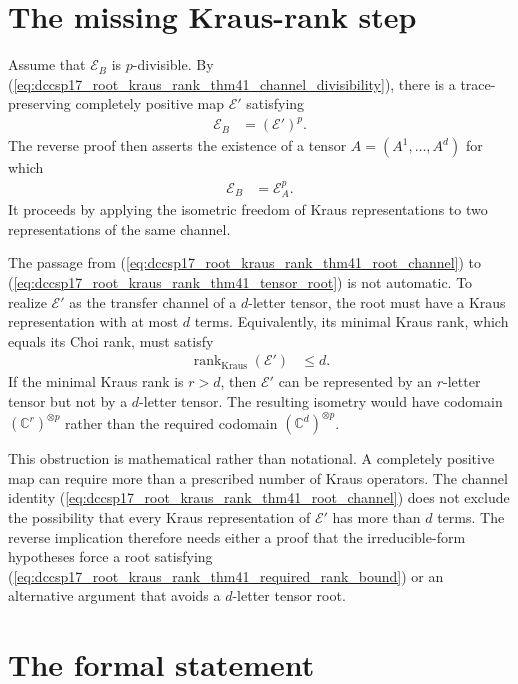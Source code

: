 \documentclass{article}
\begin{document}
\section{The missing Kraus-rank step}

Assume that $\mathcal E_B$ is $p$-divisible. By
(\ref{eq:dccsp17_root_kraus_rank_thm41_channel_divisibility}), there is a
trace-preserving completely positive map $\mathcal E'$ satisfying
\begin{align}
    \mathcal E_B
    &=(\mathcal E')^p.
    \label{eq:dccsp17_root_kraus_rank_thm41_root_channel}
\end{align}
The reverse proof then asserts the existence of a tensor
$A=(A^1,\ldots,A^d)$ for which
\begin{align}
    \mathcal E_B
    &=\mathcal E_A^p.
    \label{eq:dccsp17_root_kraus_rank_thm41_tensor_root}
\end{align}
It proceeds by applying the isometric freedom of Kraus representations to two
representations of the same channel.

The passage from
(\ref{eq:dccsp17_root_kraus_rank_thm41_root_channel}) to
(\ref{eq:dccsp17_root_kraus_rank_thm41_tensor_root}) is not automatic. To
realize $\mathcal E'$ as the transfer channel of a $d$-letter tensor, the root
must have a Kraus representation with at most $d$ terms. Equivalently, its
minimal Kraus rank, which equals its Choi rank, must satisfy
\begin{align}
    \operatorname{rank}_{\mathrm{Kraus}}(\mathcal E')
    &\leq d.
    \label{eq:dccsp17_root_kraus_rank_thm41_required_rank_bound}
\end{align}
If the minimal Kraus rank is $r>d$, then $\mathcal E'$ can be represented by
an $r$-letter tensor but not by a $d$-letter tensor. The resulting isometry
would have codomain $(\mathbb C^r)^{\otimes p}$ rather than the required
codomain $(\mathbb C^d)^{\otimes p}$.

This obstruction is mathematical rather than notational. A completely
positive map can require more than a prescribed number of Kraus operators.
The channel identity
(\ref{eq:dccsp17_root_kraus_rank_thm41_root_channel}) does not exclude the
possibility that every Kraus representation of $\mathcal E'$ has more than
$d$ terms. The reverse implication therefore needs either a proof that the
irreducible-form hypotheses force a root satisfying
(\ref{eq:dccsp17_root_kraus_rank_thm41_required_rank_bound}) or an alternative
argument that avoids a $d$-letter tensor root.

\section{The formal statement}
\end{document}
